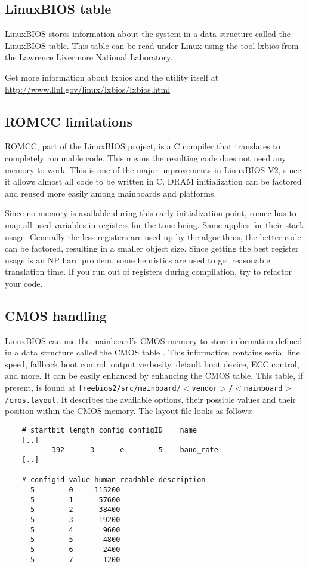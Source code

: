 \documentclass[titlepage,12pt]{article}
\begin{document}
\subsection{LinuxBIOS table}
LinuxBIOS stores information about the system in a data structure called
the LinuxBIOS table. This table can be read under Linux using the tool
lxbios from the Lawrence Livermore National Laboratory.

Get more information about lxbios and the utility itself at
\url{http://www.llnl.gov/linux/lxbios/lxbios.html}

\subsection{ROMCC limitations}
ROMCC, part of the LinuxBIOS project, is a C compiler that translates to
completely rommable code. This means the resulting code does not need
any memory to work. This is one of the major improvements in LinuxBIOS
V2, since it allows almost all code to be written in C. DRAM
initialization can be factored and reused more easily among mainboards
and platforms.

Since no memory is available during this early initialization point,
romcc has to map all used variables in registers for the time being.
Same applies for their stack usage.  Generally the less registers are
used up by the algorithms, the better code can be factored, resulting in
a smaller object size. Since getting the best register usage is an NP
hard problem, some heuristics are used to get reasonable translation
time. If you run out of registers during compilation, try to refactor
your code.

\subsection{CMOS handling}
LinuxBIOS can use the mainboard's CMOS memory to store information
defined in a data structure called the CMOS table . This information
contains serial line speed, fallback boot control, output verbosity,
default boot device, ECC control, and more. It can be easily enhanced by
enhancing the CMOS table. This table, if present, is found at
\texttt{freebios2/src/mainboard/$<$vendor$>$/$<$mainboard$>$/cmos.layout}.
It describes the available options, their possible values and their
position within the CMOS memory. The layout file looks as follows:
\begin{verbatim}
    # startbit length config configID    name
    [..]
           392      3      e        5    baud_rate
    [..]
    
    # configid value human readable description
      5        0     115200
      5        1      57600
      5        2      38400
      5        3      19200
      5        4       9600
      5        5       4800
      5        6       2400
      5        7       1200
    
\end{verbatim}
\end{document}
